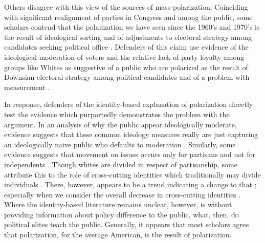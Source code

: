 \documentclass [12pt]{article}
\begin{document}
Others disagree with this view of the sources of mass-polarization. Coinciding with significant realignment of parties in Congress and among the public, some scholars contend that the polarization we have seen since the 1960's and 1970's is the result of ideological sorting and of adjustments to electoral strategy among candidates seeking political office \citep{fiorina_abrams_2008}. Defenders of this claim use evidence of the ideological moderation of voters and the relative lack of party loyalty among groups like Whites as suggestive of a public who are polarized as the result of Downsian electoral strategy among political candidates and of a problem with measurement \citep{fiorina_et-al_2008}. 

In response, defenders of the identity-based explanation of polarization directly test the evidence which purportedly demonstrates the problem with the argument. In an analysis of why the public appear ideologically moderate, evidence suggests that these common ideology measures really are just capturing an ideologically naive public who defaults to moderation \citep{kinder_kalmoe_2017}. Similarly, some evidence suggests that movement on issues occurs only for partisans and not for independents \citep{layman_carsey_2002}. Though whites are divided in respect of partisanship, some attribute this to the role of cross-cutting identities which traditionally may divide individuals \citep{baldassarri_goldberg_2014}. There, however, appears to be a trend indicating a change to that \citep{sides_et-al_2018}; especially when we consider the overall decrease in cross-cutting identities \citep{mason_2018}. Where the identity-based literature remains unclear, however, is without providing information about policy difference to the public, what, then, do political elites teach the public. Generally, it appears that most scholars agree that polarization, for the average American, is the result of polarization.
\end{document}

